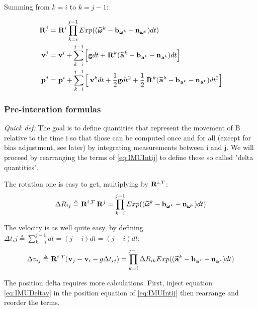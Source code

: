 \documentclass[11pt]{article}
\newcommand{\Rot}[2]{\prescript{#1}{}{\bfR}_{#2}}
\newcommand{\noise}{\bfn}
\newcommand{\posi}[2]{\prescript{#1}{}{\bfp}_{#2}}
\newcommand{\vel}[2]{\prescript{#1}{}{\bfv}_{#2}}
\newcommand{\acc}[2]{\prescript{#1}{}{\bfa}_{#2}}
\newcommand{\accm}[2]{\prescript{#1}{}{\widetilde{\bfa}}_{#2}}
\newcommand{\angvel}[2]{\prescript{#1}{}{\pmb{\omega}}_{#2}}
\newcommand{\angvelm}[2]{\prescript{#1}{}{\widetilde{\pmb{\omega}}}_{#2}}
\newcommand{\grav}{\bfg}
\begin{document}
Summing from $k=i$ to $k=j-1$:

\begin{equation}
\begin{split}
\Rot{}{}^{j}  &= \Rot{}{}^{i} \prod_{k=i}^{j-1} Exp((\angvelm{}{}^k - \bfb_{\angvel{}{}^k} - \noise_{\angvel{}{}^k})dt)
\\
\vel{}{}^{j}  &= \vel{}{}^{i} + \sum_{k=i}^{j-1} \Big[\grav dt + \Rot{}{}^{k}(\accm{}{}^k - \bfb_{\acc{}{}^k} - \noise_{\acc{}{}^k})dt \Big]
\\
\posi{}{}^{j} &= \posi{}{}^{i} + \sum_{k=i}^{j-1} \Big[\vel{}{}^{k}dt + \frac{1}{2}\grav dt^2 
+ \frac{1}{2}\Rot{}{}^{k}(\accm{}{}^k - \bfb_{\acc{}{}^k} - \noise_{\acc{}{}^k})dt^2 \Big]
\end{split}
\label{eq:IMUIntij}
\end{equation}

\subsubsection{Pre-interation formulas}
\textit{Quick def:} The goal is to define quantities that represent the movement of B relative to the time i so that those can be computed once and for all (except for bias adjustment, see later) by integrating measurements between i and j. We will proceed by rearranging the terms of \ref{eq:IMUIntij} to define these so called "delta quantities".

The rotation one is easy to get, multiplying by $\Rot{}{}^{i,T}$:
\begin{equation}
    \Delta R_{ij} \triangleq \Rot{}{}^{i,T} \Rot{}{}^{j} = \prod_{k=i}^{j-1} Exp((\angvelm{}{}^k - \bfb_{\angvel{}{}^k} - \noise_{\angvel{}{}^k})dt)
    \label{eq:IMUDeltaR}
\end{equation}

The velocity is as well quite easy, by defining $\Delta t_ij \triangleq \sum_{k=i}^{j-1} dt = (j-i)dt = (j - i)dt$:
\begin{equation}
    \Delta v_{ij} \triangleq \Rot{}{}^{i,T} (\vel{}{j} - \vel{}{i} - g \Delta t_{ij}) 
    = \prod_{k=i}^{j-1} \Delta R_{ik} Exp((\accm{}{}^k - \bfb_{\acc{}{}^k} - \noise_{\acc{}{}^k})dt)
    \label{eq:IMUDeltav}
\end{equation}

The position delta requires more calculations. First, inject equation \ref{eq:IMUDeltav} in the position equation of \ref{eq:IMUIntij} then rearrange and reorder the terms.
\end{document}
